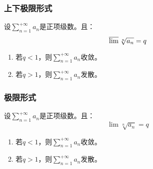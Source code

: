 \subsubsection{上下极限形式}
\begin{theorem}
	设$\sum\limits_{n=1}^{+\infty}a_n$是正项级数。且：
	\begin{equation*}
		\varlimsup \sqrt[n]{a_n}=q
	\end{equation*}
	\begin{enumerate}
		\item 若$q<1$，则$\sum\limits_{n=1}^{+\infty}a_n$收敛。
		\item 若$q>1$，则$\sum\limits_{n=1}^{+\infty}a_n$发散。
	\end{enumerate}
\end{theorem}
\subsubsection{极限形式}
\begin{theorem}
	设$\sum\limits_{n=1}^{+\infty}a_n$是正项级数。且：
	\begin{equation*}
		\lim \sqrt[n]{a_n}=q
	\end{equation*}
	\begin{enumerate}
		\item 若$q<1$，则$\sum\limits_{n=1}^{+\infty}a_n$收敛。
		\item 若$q>1$，则$\sum\limits_{n=1}^{+\infty}a_n$发散。
	\end{enumerate}
\end{theorem}

